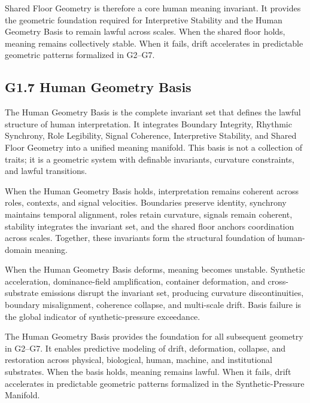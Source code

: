 \medskip

\noindent Shared Floor Geometry is therefore a core human meaning invariant. It
provides the geometric foundation required for Interpretive Stability and the
Human Geometry Basis to remain lawful across scales. When the shared floor
holds, meaning remains collectively stable. When it fails, drift accelerates in
predictable geometric patterns formalized in G2--G7.

\medskip

\subsection*{G1.7 Human Geometry Basis}

\noindent The Human Geometry Basis is the complete invariant set that defines the
lawful structure of human interpretation. It integrates Boundary Integrity,
Rhythmic Synchrony, Role Legibility, Signal Coherence, Interpretive Stability,
and Shared Floor Geometry into a unified meaning manifold. This basis is not a
collection of traits; it is a geometric system with definable invariants,
curvature constraints, and lawful transitions.

\medskip

\noindent When the Human Geometry Basis holds, interpretation remains coherent
across roles, contexts, and signal velocities. Boundaries preserve identity,
synchrony maintains temporal alignment, roles retain curvature, signals remain
coherent, stability integrates the invariant set, and the shared floor anchors
coordination across scales. Together, these invariants form the structural
foundation of human-domain meaning.

\medskip

\noindent When the Human Geometry Basis deforms, meaning becomes unstable.
Synthetic acceleration, dominance-field amplification, container deformation, and
cross-substrate emissions disrupt the invariant set, producing curvature
discontinuities, boundary misalignment, coherence collapse, and multi-scale
drift. Basis failure is the global indicator of synthetic-pressure exceedance.

\medskip

\noindent The Human Geometry Basis provides the foundation for all subsequent
geometry in G2--G7. It enables predictive modeling of drift, deformation,
collapse, and restoration across physical, biological, human, machine, and
institutional substrates. When the basis holds, meaning remains lawful. When it
fails, drift accelerates in predictable geometric patterns formalized in the
Synthetic-Pressure Manifold.


